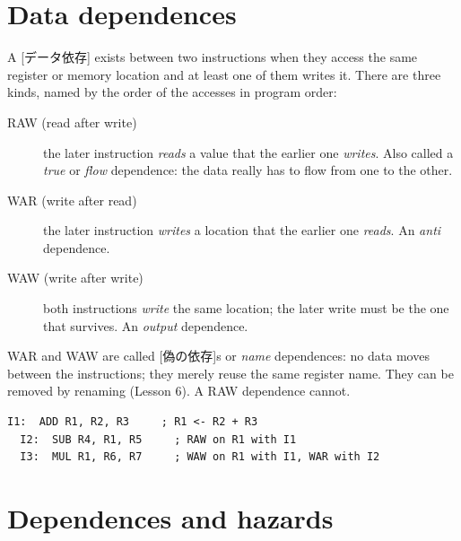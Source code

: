 \documentclass[../main.tex]{subfiles}
\begin{document}
\section{Data dependences}

A [データ依存] exists between two instructions when
they access the same register or memory location and at least one of them
writes it.  There are three
kinds, named by the order of the accesses in program order:

\begin{description}
  \item[RAW (read after write)]%
    the later instruction \emph{reads} a value
    that the earlier one \emph{writes}.  Also called a \emph{true} or
    \emph{flow} dependence: the data really has to flow from one to the
    other.
  \item[WAR (write after read)]%
    the later instruction \emph{writes} a
    location that the earlier one \emph{reads}.  An \emph{anti} dependence.
  \item[WAW (write after write)]%
    both instructions \emph{write} the same
    location; the later write must be the one that survives.  An
    \emph{output} dependence.
\end{description}

WAR and WAW are called [偽の依存]s or \emph{name}
dependences: no data moves between the instructions; they merely reuse the
same register name.  They can be removed by renaming (Lesson 6).  A RAW
dependence cannot.

\begin{example}\leavevmode %
  \begin{lstlisting}[language={[x86masm]Assembler}, numbers=none]
  I1:  ADD R1, R2, R3     ; R1 <- R2 + R3
  I2:  SUB R4, R1, R5     ; RAW on R1 with I1
  I3:  MUL R1, R6, R7     ; WAW on R1 with I1, WAR with I2
\end{lstlisting}
\end{example}

\section{Dependences and hazards}
\end{document}
